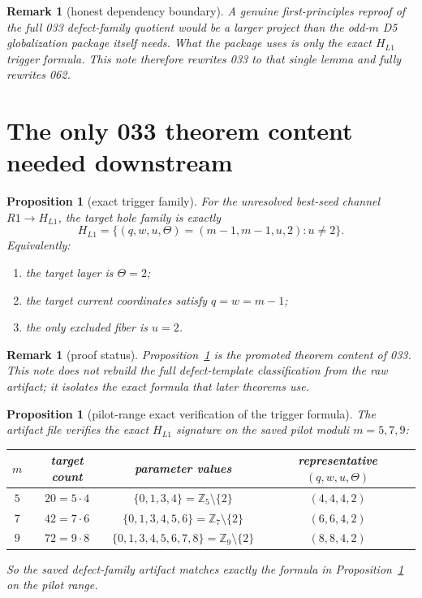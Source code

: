 \documentclass[11pt]{article}
\newtheorem{proposition}[theorem]{Proposition}
\newtheorem{remark}[theorem]{Remark}
\newcommand{\Z}{\mathbb Z}
\begin{document}
\begin{remark}[honest dependency boundary]
A genuine first-principles reproof of the full 033 defect-family quotient would
be a larger project than the odd-$m$ D5 globalization package itself needs.
What the package uses is only the exact $H_{L1}$ trigger formula. This note
therefore rewrites 033 to that single lemma and fully rewrites 062.
\end{remark}

\section{The only 033 theorem content needed downstream}

\begin{proposition}[exact trigger family]\label{prop:trigger-family}
For the unresolved best-seed channel $R1\to H_{L1}$, the target hole family is
exactly
\[
H_{L1}=\{(q,w,u,\Theta)=(m-1,m-1,u,2):u\neq 2\}.
\]
Equivalently:
\begin{enumerate}[label=\textup{(\arabic*)},leftmargin=2.5em]
\item the target layer is $\Theta=2$;
\item the target current coordinates satisfy $q=w=m-1$;
\item the only excluded fiber is $u=2$.
\end{enumerate}
\end{proposition}

\begin{remark}[proof status]
Proposition~\ref{prop:trigger-family} is the promoted theorem content of 033.
This note does not rebuild the full defect-template classification from the raw
artifact; it isolates the exact formula that later theorems use.
\end{remark}

\begin{proposition}[pilot-range exact verification of the trigger formula]
The artifact file
verifies the exact $H_{L1}$ signature on the saved pilot moduli $m=5,7,9$:
\begin{center}
\begin{tabular}{cccc}
\toprule
$m$ & target count & parameter values & representative $(q,w,u,\Theta)$ \\
\midrule
$5$ & $20=5\cdot 4$ & $\{0,1,3,4\}=\Z_5\setminus\{2\}$ & $(4,4,4,2)$ \\
$7$ & $42=7\cdot 6$ & $\{0,1,3,4,5,6\}=\Z_7\setminus\{2\}$ & $(6,6,4,2)$ \\
$9$ & $72=9\cdot 8$ & $\{0,1,3,4,5,6,7,8\}=\Z_9\setminus\{2\}$ & $(8,8,4,2)$ \\
\bottomrule
\end{tabular}
\end{center}
So the saved defect-family artifact matches exactly the formula in
Proposition~\ref{prop:trigger-family} on the pilot range.
\end{proposition}
\end{document}
